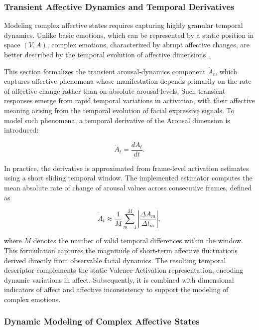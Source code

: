 \documentclass[letterpaper, 10 pt, conference]{ieeeconf}  %
\begin{document}
\subsubsection{Transient Affective Dynamics and Temporal Derivatives}

Modeling complex affective states requires capturing highly granular temporal dynamics. Unlike basic emotions, which can be represented by a static position in space $(V, A)$, complex emotions, characterized by abrupt affective changes, are better described by the temporal evolution of affective dimensions \cite{kuppens2010emotional, 911197}.

This section formalizes the transient arousal-dynamics component $\dot{A}_t$, which captures affective phenomena whose manifestation depends primarily on the rate of affective change rather than on absolute arousal levels. Such transient responses emerge from rapid temporal variations in activation, with their affective meaning arising from the temporal evolution of facial expressive signals. To model such phenomena, a temporal derivative of the Arousal dimension is introduced:

\begin{equation}
\dot{A}_t = \frac{dA_t}{dt}.
\end{equation}

In practice, the derivative is approximated from frame-level activation estimates using a short sliding temporal window. The implemented estimator computes the mean absolute rate of change of arousal values across consecutive frames, defined as

\begin{equation}
\dot{A}_t \approx 
\frac{1}{M}
\sum_{m=1}^{M}
\left|
\frac{\Delta A_m}{\Delta t_m}
\right|,
\end{equation}

where $M$ denotes the number of valid temporal differences within the window. This formulation captures the magnitude of short-term affective fluctuations derived directly from observable facial dynamics. The resulting temporal descriptor complements the static Valence-Activation representation, encoding dynamic variations in affect. Subsequently, it is combined with dimensional indicators of affect and affective inconsistency to support the modeling of complex emotions.

\subsubsection{Dynamic Modeling of Complex Affective States}
\end{document}
